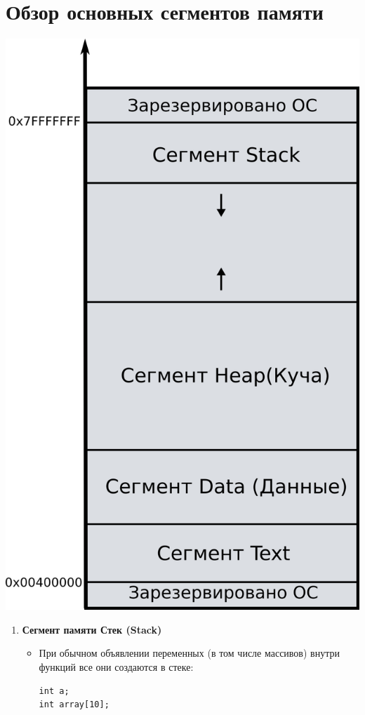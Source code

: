 \documentclass{article}
\begin{document}
\section*{Обзор основных сегментов памяти}
\begin{multicols}{2}
\begin{center}
\includegraphics[scale=1.1]{../images/memory_layout.png}
\end{center}
\columnbreak
\begin{enumerate}
\item \textbf{Сегмент памяти Стек (Stack)} \\
\begin{itemize}
\item При обычном объявлении переменных (в том числе массивов) внутри функций все они создаются в стеке: 
\begin{lstlisting}
int a; 
int array[10];
\end{lstlisting}



\end{itemize}
\end{enumerate}
\end{multicols}
\end{document}

